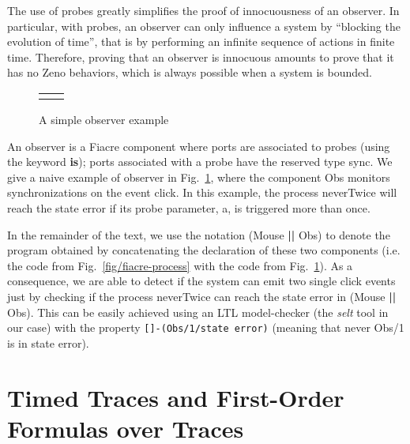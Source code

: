 \documentclass[a4paper]{scrartcl}
\def\code#1{\textsf{\small\bfseries #1}}
\def\vars#1{\textsf{\small #1}}
\begin{document}
The use of probes greatly simplifies the proof of innocuousness of an
observer. In particular, with probes, an observer can only influence a
system by ``blocking the evolution of time'', that is by performing an
infinite sequence of actions in finite time. Therefore, proving that
an observer is innocuous amounts to prove that it has no Zeno
behaviors, which is always possible when a system is bounded.


\begin{figure}[tbh]
  \centering
  \begin{tabular}{l|@{\quad}l}
    \begin{minipage}[t]{0.42\linewidth}
      {}
    \end{minipage}
    &
    \begin{minipage}[t]{0.42\linewidth}
      {}
    \end{minipage}
  \end{tabular}
  \caption{A simple observer example\label{fig/fiacre-obs}}
\end{figure}

An observer is a Fiacre component where ports are associated to probes
(using the keyword \code{is}); ports associated with a probe have the
reserved type \vars{sync}. We give a naive example of observer in
Fig.~\ref{fig/fiacre-obs}, where the component \vars{Obs} monitors
synchronizations on the event \vars{click}. In this example, the
process \vars{neverTwice} will reach the state \vars{error} if its
probe parameter, \vars{a}, is triggered more than once.

In the remainder of the text, we use the notation (\vars{Mouse}
\code{||} \vars{Obs}) to denote the program obtained by concatenating
the declaration of these two components (i.e. the code from
Fig.~\ref{fig/fiacre-process} with the code from
Fig.~\ref{fig/fiacre-obs}). As a consequence, we are able to detect if
the system can emit two single click events just by checking if the
process \vars{neverTwice} can reach the state \vars{error} in
(\vars{Mouse} \code{||} \vars{Obs}). This can be easily achieved using
an LTL model-checker (the \emph{selt} tool in our case) with the
property \texttt{[]-(Obs/1/state error)} (meaning that never
\vars{Obs/1} is in state \vars{error}).

\section{Timed Traces and First-Order Formulas over Traces}
\label{sec3:timedtrace}
\end{document}
